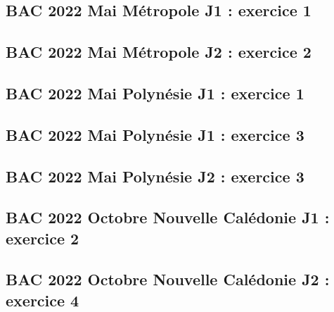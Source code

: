 \documentclass[lang=fr,edition=teacher,layout=sheet]{mxbook}
\begin{document}
\begingroup\endgroup
\par\bigskip
{}\subsection*{BAC 2022 Mai Métropole J1 : exercice 1}
\begingroup\endgroup
\par\bigskip
{}\subsection*{BAC 2022 Mai Métropole J2 : exercice 2}
\begingroup\endgroup
\par\bigskip
{}\subsection*{BAC 2022 Mai Polynésie J1 : exercice 1}
\begingroup\endgroup
\par\bigskip
{}\subsection*{BAC 2022 Mai Polynésie J1 : exercice 3}
\begingroup\endgroup
\par\bigskip
{}\subsection*{BAC 2022 Mai Polynésie J2 : exercice 3}
\begingroup\endgroup
\par\bigskip
{}\subsection*{BAC 2022 Octobre Nouvelle Calédonie J1 : exercice 2}
\begingroup\endgroup
\par\bigskip
{}\subsection*{BAC 2022 Octobre Nouvelle Calédonie J2 : exercice 4}
\end{document}
